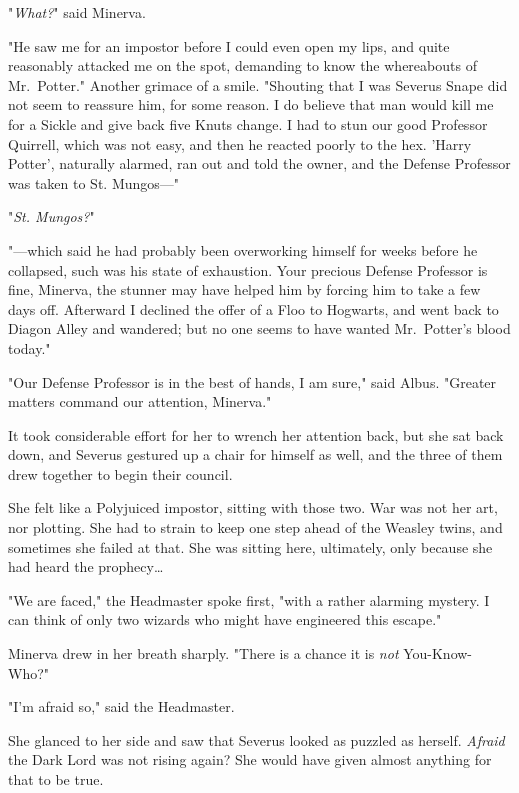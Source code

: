 "\emph{What?}" said Minerva.

"He saw me for an impostor before I could even open my lips, and quite 
reasonably attacked me on the spot, demanding to know the whereabouts of 
Mr.~Potter." Another grimace of a smile. "Shouting that I was Severus Snape did 
not seem to reassure him, for some reason. I do believe that man would kill me 
for a Sickle and give back five Knuts change. I had to stun our good Professor 
Quirrell, which was not easy, and then he reacted poorly to the hex. 'Harry 
Potter', naturally alarmed, ran out and told the owner, and the Defense 
Professor was taken to St. Mungos---"

"\emph{St. Mungos?}"

"---which said he had probably been overworking himself for weeks before he 
collapsed, such was his state of exhaustion. Your precious Defense Professor is 
fine, Minerva, the stunner may have helped him by forcing him to take a few 
days off. Afterward I declined the offer of a Floo to Hogwarts, and went back 
to Diagon Alley and wandered; but no one seems to have wanted Mr.~Potter's 
blood today."

"Our Defense Professor is in the best of hands, I am sure," said Albus. 
"Greater matters command our attention, Minerva."

It took considerable effort for her to wrench her attention back, but she sat 
back down, and Severus gestured up a chair for himself as well, and the three 
of them drew together to begin their council.

She felt like a Polyjuiced impostor, sitting with those two. War was not her 
art, nor plotting. She had to strain to keep one step ahead of the Weasley 
twins, and sometimes she failed at that. She was sitting here, ultimately, only 
because she had heard the prophecy{\ldots}

"We are faced," the Headmaster spoke first, "with a rather alarming mystery. I 
can think of only two wizards who might have engineered this escape."

Minerva drew in her breath sharply. "There is a chance it is \emph{not} 
You-Know-Who?"

"I'm afraid so," said the Headmaster.

She glanced to her side and saw that Severus looked as puzzled as herself. 
\emph{Afraid} the Dark Lord was not rising again? She would have given almost 
anything for that to be true.


